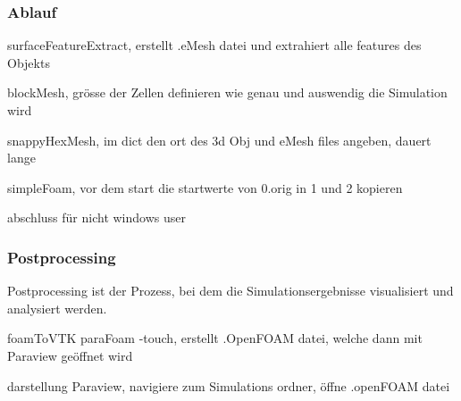 


\subsubsection{Ablauf\label{openfoam:section:Ablauf}}
surfaceFeatureExtract, erstellt .eMesh datei und extrahiert alle features des Objekts

blockMesh, grösse der Zellen definieren wie genau und auswendig die Simulation wird

snappyHexMesh, im dict den ort des 3d Obj und eMesh files angeben, dauert lange

simpleFoam, vor dem start die startwerte von 0.orig in 1 und 2 kopieren

abschluss für nicht windows user

\subsubsection{Postprocessing}
Postprocessing ist der Prozess, bei dem die Simulationsergebnisse visualisiert und analysiert werden. 



foamToVTK
paraFoam -touch, erstellt .OpenFOAM datei, welche dann mit Paraview geöffnet wird

darstellung
Paraview, navigiere zum Simulations ordner, öffne .openFOAM datei